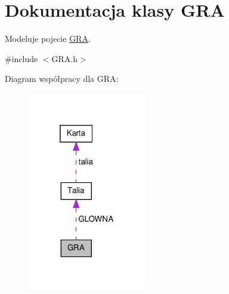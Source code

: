 \hypertarget{class_g_r_a}{\section{Dokumentacja klasy G\-R\-A}
\label{class_g_r_a}
}


Modeluje pojecie \hyperlink{class_g_r_a}{G\-R\-A}.  




{\ttfamily \#include $<$G\-R\-A.\-h$>$}



Diagram współpracy dla G\-R\-A\-:\nopagebreak
\begin{figure}[H]
\begin{center}
\leavevmode
\includegraphics[width=148pt]{class_g_r_a__coll__graph}
\end{center}
\end{figure}
